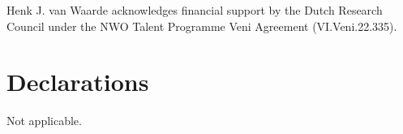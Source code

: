 \documentclass[pdflatex,sn-mathphys-num]{sn-jnl}%
\theoremstyle{thmstyleone}
\begin{document}
\backmatter


Henk J. van Waarde acknowledges financial support by the Dutch Research Council under the NWO Talent Programme Veni Agreement (VI.Veni.22.335).

\section*{Declarations}

Not applicable. 







\end{document}
